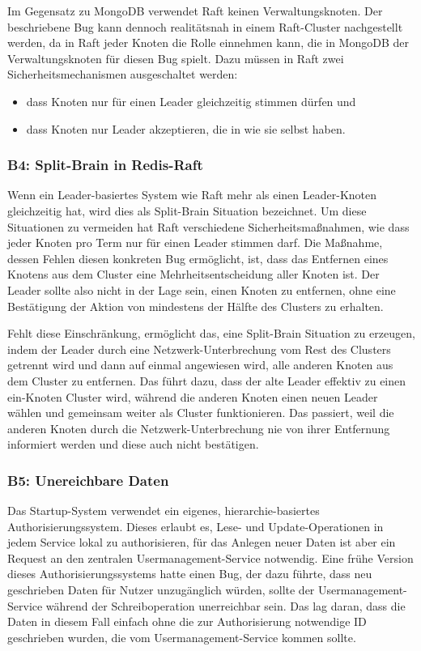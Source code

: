 \documentclass[12pt,a4paper]{report}
\begin{document}
Im Gegensatz zu MongoDB verwendet Raft keinen Verwaltungsknoten. Der beschriebene Bug kann dennoch realitätsnah in einem
Raft-Cluster nachgestellt werden, da in Raft jeder Knoten die Rolle einnehmen kann, die in MongoDB der Verwaltungsknoten für diesen
Bug spielt. Dazu müssen in Raft zwei Sicherheitsmechanismen ausgeschaltet werden:
\begin{itemize}
	\item dass Knoten nur für einen Leader gleichzeitig stimmen dürfen und
	\item dass Knoten nur Leader akzeptieren,  die in  wie sie selbst haben.
\end{itemize}

\subsubsection{B4: Split-Brain in Redis-Raft}
Wenn ein Leader-basiertes System wie Raft mehr als einen Leader-Knoten gleichzeitig hat, wird dies als Split-Brain Situation
bezeichnet. Um diese Situationen zu vermeiden hat Raft verschiedene Sicherheitsmaßnahmen, wie dass jeder Knoten pro Term nur für
einen Leader stimmen darf. Die Maßnahme, dessen Fehlen diesen konkreten Bug ermöglicht, ist, dass das Entfernen eines Knotens aus
dem Cluster eine Mehrheitsentscheidung aller Knoten ist. Der Leader sollte also nicht in der Lage sein, einen Knoten zu entfernen,
ohne eine Bestätigung der Aktion von mindestens der Hälfte des Clusters zu erhalten.

Fehlt diese Einschränkung, ermöglicht das, eine Split-Brain Situation zu erzeugen, indem der Leader durch eine
Netzwerk-Unterbrechung vom Rest des Clusters getrennt wird und dann auf einmal angewiesen wird, alle anderen Knoten aus dem
Cluster zu entfernen. Das führt dazu, dass der alte Leader effektiv zu einen ein-Knoten Cluster wird, während die anderen Knoten
einen neuen Leader wählen und gemeinsam weiter als Cluster funktionieren. Das passiert, weil die anderen Knoten durch die
Netzwerk-Unterbrechung nie von ihrer Entfernung informiert werden und diese auch nicht bestätigen.

\subsubsection{B5: Unereichbare Daten}
Das Startup-System verwendet ein eigenes, hierarchie-basiertes Authorisierungssystem. Dieses erlaubt es, Lese- und
Update-Operationen in jedem Service lokal zu authorisieren, für das Anlegen neuer Daten ist aber ein Request an den zentralen
Usermanagement-Service notwendig. Eine frühe Version dieses Authorisierungssystems hatte einen Bug, der dazu führte, dass neu
geschrieben Daten für Nutzer unzugänglich würden, sollte der Usermanagement-Service während der Schreiboperation unerreichbar
sein. Das lag daran, dass die Daten in diesem Fall einfach ohne die zur Authorisierung notwendige ID geschrieben wurden, die vom
Usermanagement-Service kommen sollte.
\end{document}
